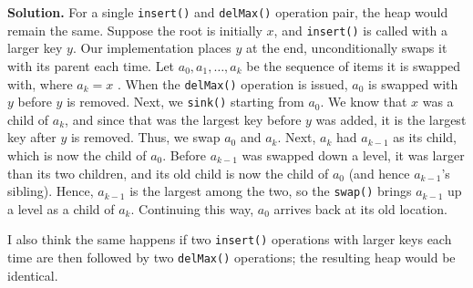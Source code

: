 \documentclass[12pt, a4paper]{article}
\newenvironment{sol}[1][Solution]
{\par\medskip\noindent \textbf{#1.} }
{\medskip}
\begin{document}
	\begin{sol}
		For a single \texttt{insert()} and \texttt{delMax()} operation pair, the heap would remain
		the same. Suppose the root is initially $x$, and \texttt{insert()} is called
		with a larger key $y$. Our implementation places $y$ at the end,
		unconditionally swaps it with its parent each time. Let $a_0,a_1,\ldots,a_k$ be
		the sequence of items it is swapped with, where $a_k=x$ . When the \texttt{delMax()}
		operation is issued, $a_0$ is swapped with $y$ before $y$ is removed. Next,
		we \texttt{sink()} starting from $a_0$. We know that $x$ was a child of
		$a_k$, and since that was the largest key before $y$ was added, it is the
		largest key after $y$ is removed. Thus, we swap $a_0$ and $a_k$. Next, $a_k$
		had $a_{k-1}$ as its child, which is now the child of $a_0$. Before $a_{k-1}$
		was swapped down a level, it was larger than its two children, and its old child
		is now the child of $a_0$ (and hence $a_{k-1}$'s sibling). Hence, $a_{k-1}$
		is the largest among the two, so the \texttt{swap()} brings $a_{k-1}$ up a level
		as a child of $a_{k}$. Continuing this way, $a_0$ arrives back at its old location.
		
		I also think the same happens if two \texttt{insert()} operations with larger
		keys each time are then followed by two \texttt{delMax()} operations; the
		resulting heap would be identical.
	\end{sol}
	\pagebreak
	\printbibliography
\end{document}
